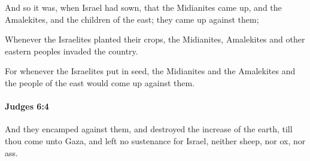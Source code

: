 			\begin{versebox}
					\item[BHS] 
					\item[ASV] And so it was, when Israel had sown, that the Midianites came up, and the Amalekites, and the children of the east; they came up against them;
					\item[NIV] Whenever the Israelites planted their crops, the Midianites, Amalekites and other eastern peoples invaded the country.
					\item[NRSV] For whenever the Israelites put in seed, the Midianites and the Amalekites and the people of the east would come up against them.
			\end{versebox}

		\paragraph{Judges 6:4} %
			\label{JUDGES-6-4}

			And they encamped against them, and destroyed the increase of the earth, till thou come unto Gaza, and left no sustenance for Israel, neither sheep, nor ox, nor ass.

